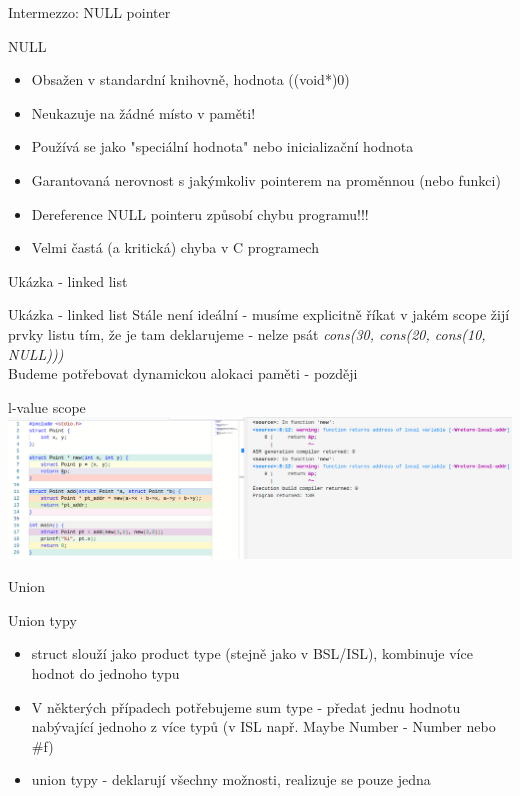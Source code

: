 \documentclass[9pt]{beamer}
\begin{document}
\begin{frame}{Intermezzo: NULL pointer}
    \begin{block}{NULL}
        \begin{itemize}
            \item Obsažen v standardní knihovně, hodnota ((void*)0)
            \item Neukazuje na žádné místo v paměti!
            \item Používá se jako "speciální hodnota" nebo inicializační hodnota
            \item Garantovaná nerovnost s jakýmkoliv pointerem na proměnnou (nebo funkci)
            \item Dereference NULL pointeru způsobí chybu programu!!!
            \item Velmi častá (a kritická) chyba v C programech
        \end{itemize}
    \end{block}
    
\end{frame}

\begin{frame}{Ukázka - linked list}
    
\end{frame}

\begin{frame}{Ukázka - linked list}
    Stále není ideální - musíme explicitně říkat v jakém scope žijí prvky listu tím,
    že je tam deklarujeme - nelze psát \textit{cons(30, cons(20, cons(10, NULL)))}
    \\
    Budeme potřebovat dynamickou alokaci paměti - později
\end{frame}

\begin{frame}{l-value scope}
    \includegraphics[width=0.99\linewidth]{lekce21/local_variable.png}
\end{frame}

\begin{frame}{Union}
    \begin{block}{Union typy}
        \begin{itemize}
            \item struct slouží jako product type (stejně jako v BSL/ISL),
            kombinuje více hodnot do jednoho typu
            \item V některých případech potřebujeme sum type - předat jednu hodnotu
            nabývající jednoho z více typů (v ISL např. Maybe Number - Number nebo \#f)
            \item union typy - deklarují všechny možnosti, realizuje se pouze jedna
        \end{itemize}
    \end{block}
    
\end{frame}
\end{document}
